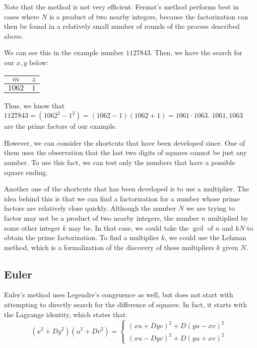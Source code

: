 \documentclass{article}
\begin{document}
\par Note that the method is not very efficient. Fermat's method performs best in cases where $N$ is a product of
two nearby integers, because the factorization can then be found in a relatively small number of rounds of the
process described above.

\par We can see this in the example number $1127843$. Then, we have the search for our $x,y$ below:
\begin{center}
    \begin{tabular}{ | c | c | }
        \hline
        $m$ & $z$ \\ \hline
        $1062$ & $1$ \\
        \hline
    \end{tabular}
\end{center}
\par Thus, we know that $1127843=(1062^2-1^2)=(1062-1)(1062+1)=1061\cdot1063$. $1061,1063$ are the prime factors
of our example.

\par However, we can consider the shortcuts that have been developed since. One of them uses the observation that
the last two digits of squares cannot be just any number. To use this fact, we can test only the numbers that have a
possible square ending.

\par Another one of the shortcuts that has been developed is to use a multiplier. The idea behind this is that
we can find a factorization for a number whose prime factors are relatively close quickly. Although the number $N$ we
are trying to factor may not be a product of two nearby integers, the number $n$ multiplied by some other integer $k$
may be. In that case, we could take the $\gcd$ of $n$ and $kN$ to obtain the prime factorization. To find a multiplier
$k$, we could use the Lehman method, which is a formalization of the discovery of these multipliers $k$ given $N$.


\subsection{Euler}
\par Euler's method uses Legendre's congruence as well, but does not start with attempting to directly search for the
difference of squares. In fact, it starts with the Lagrange identity, which states that:
$$(x^2+Dy^2)(u^2+Dv^2) = \begin{cases} (xu+Dyv)^2 + D(yu-xv)^2 \\
    (xu - Dyv)^2 + D(yu+xv)^2 \end{cases}$$
\end{document}
